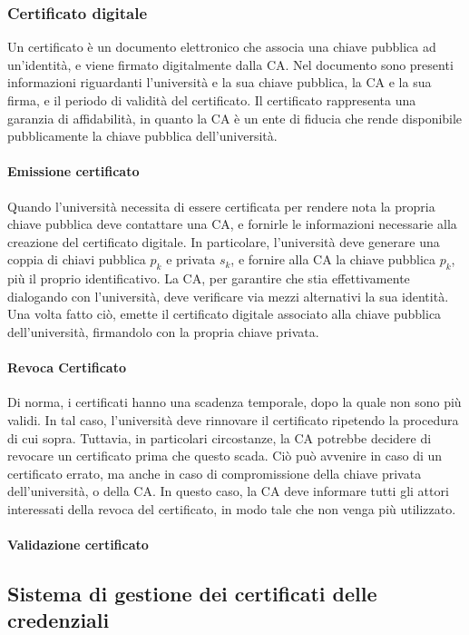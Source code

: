 \documentclass[a4paper,12pt]{article}
\begin{document}
\subsubsection{Certificato digitale} 
Un certificato è un documento elettronico che associa una chiave pubblica ad un'identità, e viene firmato digitalmente dalla CA. Nel documento sono presenti informazioni riguardanti l'università e la sua chiave pubblica, la CA e la sua firma, e il periodo di validità del certificato. Il certificato rappresenta una garanzia di affidabilità, in quanto la CA è un ente di fiducia che rende disponibile pubblicamente la chiave pubblica dell'università.
\paragraph{Emissione certificato} Quando l'università necessita di essere certificata per rendere nota la propria chiave pubblica deve contattare una CA, e fornirle le informazioni necessarie alla creazione del certificato digitale. In particolare, l'università deve generare una coppia di chiavi pubblica $p_k$ e privata $s_k$, e fornire alla CA la chiave pubblica $p_k$, più il proprio identificativo. La CA, per garantire che stia effettivamente dialogando con l'università, deve verificare via mezzi alternativi la sua identità. Una volta fatto ciò, emette il certificato digitale associato alla chiave pubblica dell'università, firmandolo con la propria chiave privata.
\paragraph{Revoca Certificato} Di norma, i certificati hanno una scadenza temporale, dopo la quale non sono più validi. In tal caso, l'università deve rinnovare il certificato ripetendo la procedura di cui sopra. Tuttavia, in particolari circostanze, la CA potrebbe decidere di revocare un certificato prima che questo scada. Ciò può avvenire in caso di un certificato errato, ma anche in caso di compromissione della chiave privata dell'università, o della CA. In questo caso, la CA deve informare tutti gli attori interessati della revoca del certificato, in modo tale che non venga più utilizzato.
\paragraph{Validazione certificato}
\subsection{Sistema di gestione dei certificati delle credenziali}
\end{document}
